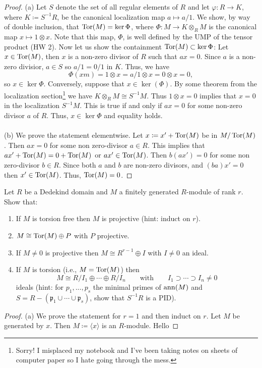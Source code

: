 \begin{proof}
(a) Let $S$ denote the set of all regular elements of $R$ and let
$\varphi\colon R\to K$, where $K\coloneqq S^{-1}R$, be the canonical
localization map $a\mapsto a/1$. We show, by way of double inclusion, that
$\operatorname{Tor}(M)=\ker\Phi$, where $\Phi\colon M\to K\otimes_R M$ is the
canonical map $x\mapsto 1\otimes x$. Note that this map, $\Phi$, is well
defined by the UMP of the tensor product (HW 2). Now let us show the
containment $\operatorname{Tor}(M)\subset\ker\Phi$: Let $x\in\operatorname{Tor}(M)$, then
$x$ is a non-zero divisor of $R$ such that $ax=0$. Since $a$ is a non-zero
divisior, $a\in S$ so $a/1=0/1$ in $K$. Thus, we have
\[
\Phi(xm)=1\otimes x=a/1\otimes x=0\otimes x=0,
\]
so $x\in\ker\Phi$. Conversely, suppose that $x\in\ker(\Phi)$. By some
theorem from the localization section\footnote{Sorry! I misplaced my
notebook and I've been taking notes on sheets of computer paper so I hate
going through the mess.} we have $K\otimes_R M\cong S^{-1}M$. Thus
$1\otimes x=0$ implies that $x=0$ in the localization $S^{-1}M$. This is
true if and only if $ax=0$ for some non-zero divisor $a$ of $R$. Thus,
$x\in\ker\Phi$ and equality holds.
\\\\
(b) We prove the statement elementwise. Let $x\coloneqq x'+\operatorname{Tor}(M)$
be in $M/\operatorname{Tor}(M)$. Then $ax=0$ for some non zero-divisor $a\in
R$. This implies that $ax'+\operatorname{Tor}(M)=0+\operatorname{Tor}(M)$ or
$ax'\in\operatorname{Tor}(M)$. Then $b(ax')=0$ for some non zero-divisor $b\in R$. Since
both $a$ and $b$ are non-zero divisors, and $(ba)x'=0$ then
$x'\in\operatorname{Tor}(M)$. Thus, $\operatorname{Tor}(M)=0$.
\end{proof}
\newpage
\begin{problem}
Let $R$ be a Dedekind domain and $M$ a finitely generated $R$-module of
rank $r$. Show that:
\begin{enumerate}[label=(\alph*)]
\item If $M$ is torsion free then $M$ is projective (hint: induct on $r$).
\item $M\cong \operatorname{Tor}(M)\oplus P$ with $P$ projective.
\item If $M\neq 0$ is projective then $M\cong R^{r-1}\oplus I$ with $I\neq
  0$ an ideal.
\item If $M$ is torsion (i.e., $M=\operatorname{Tor}(M)$) then
\[
M\cong R/I_1\oplus\cdots\oplus R/I_n\qquad\text{with}\qquad
I_1\supset\cdots\supset I_n\neq 0
\]
ideals (hint: for $p_1,...,p_s$ the minimal primes of $\operatorname{ann}(M)$ and
$S=R\minus(\mathfrak{p}_1\cup\cdots\cup\mathfrak{p}_s)$, show that
$S^{-1}R$ is a PID).
\end{enumerate}
\end{problem}
\begin{proof}
(a) We prove the statement for $r=1$ and then induct on $r$. Let $M$ be
generated by $x$. Then $M\coloneqq\langle x\rangle$ is an $R$-module. Hello
\end{proof}

